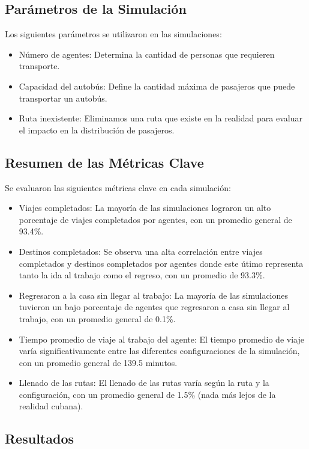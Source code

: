 \documentclass[a4paper,12pt]{article}
\begin{document}
\subsection{Parámetros de la Simulación}

Los siguientes parámetros se utilizaron en las simulaciones:

\begin{itemize}
\item Número de agentes: Determina la cantidad de personas que requieren transporte.
\item Capacidad del autobús: Define la cantidad máxima de pasajeros que puede transportar un autobús.
\item Ruta inexistente: Eliminamos una ruta que existe en la realidad para evaluar el impacto en la distribución de pasajeros.
\end{itemize}

\subsection{Resumen de las Métricas Clave}

Se evaluaron las siguientes métricas clave en cada simulación:

\begin{itemize}
\item Viajes completados: La mayoría de las simulaciones lograron un alto porcentaje de viajes completados por agentes, con un promedio general de 93.4\%.
\item Destinos completados: Se observa una alta correlación entre viajes completados y destinos completados por agentes donde este \'utimo representa tanto la ida al trabajo como el regreso, con un promedio de 93.3\%.
\item Regresaron a la casa sin llegar al trabajo: La mayoría de las simulaciones tuvieron un bajo porcentaje de agentes que regresaron a casa sin llegar al trabajo, con un promedio general de 0.1\%.
\item Tiempo promedio de viaje al trabajo del agente: El tiempo promedio de viaje varía significativamente entre las diferentes configuraciones de la simulación, con un promedio general de 139.5 minutos.
\item Llenado de las rutas: El llenado de las rutas varía según la ruta y la configuración, con un promedio general de 1.5\% (nada m\'as lejos de la realidad cubana).
\end{itemize}

\subsection{Resultados}
\end{document}
